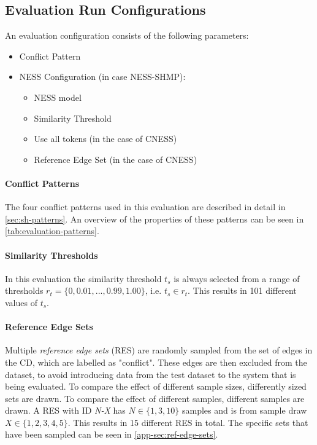 \documentclass[11pt]{scrreprt}
\begin{document}
\subsection{Evaluation Run Configurations}
An evaluation configuration consists of the following parameters: 
\begin{itemize}
	\item Conflict Pattern
	\item NESS Configuration (in case NESS-SHMP): 
	\begin{itemize}
		\item NESS model
		\item Similarity Threshold 
		\item Use  all tokens (in the case of CNESS) 
		\item Reference Edge Set (in the case of CNESS) 
	\end{itemize}
\end{itemize}

\paragraph{Conflict Patterns}
The four conflict patterns used in this evaluation are described in detail in \cref{sec:sh-patterns}. An overview of the properties of these patterns can be seen in \cref{tab:evaluation-patterns}.


\paragraph{Similarity Thresholds}
In this evaluation the similarity threshold \(t_s\) is always selected from a range of thresholds \(r_t = \{0, 0.01, ...,  0.99, 1.00\}\), i.e. \(t_s \in r_t\). This results in 101 different values of \(t_s\).


\paragraph{Reference Edge Sets}
Multiple \textit{reference edge sets} (RES)  are randomly sampled from the set of edges in the CD, which are labelled as "conflict". These edges are then excluded from the dataset, to avoid introducing data from the test dataset to the system that is being evaluated. To compare the effect of different sample sizes, differently sized sets are drawn. To compare the effect of different samples, different samples are drawn. A RES with ID \textit{N-X} has \(N \in \{1, 3, 10\}\) samples and is from sample draw \(X \in \{1, 2, 3, 4, 5\}\). This results in 15 different RES in total. The specific sets that have been sampled can be seen in \cref{app-sec:ref-edge-sets}.
\end{document}
